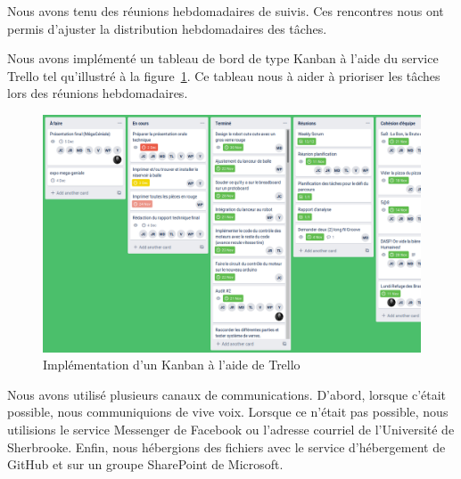 Nous avons tenu des réunions hebdomadaires de suivis.
Ces rencontres nous ont permis d'ajuster la distribution hebdomadaires des tâches.

Nous avons implémenté un tableau de bord de type Kanban à l'aide du service Trello tel qu'illustré à la figure~\ref{fig:planif-trello}.
Ce tableau nous à aider à prioriser les tâches lors des réunions hebdomadaires.

\begin{figure}[h!]
    \centering
    \includegraphics[width=\linewidth]{img/s1/trello}
    \caption{Implémentation d'un Kanban à l'aide de Trello}
    \label{fig:planif-trello}
\end{figure}

Nous avons utilisé plusieurs canaux de communications.
D'abord, lorsque c'était possible, nous communiquions de vive voix.
Lorsque ce n'était pas possible, nous utilisions le service Messenger de Facebook ou l'adresse courriel de l’Université de Sherbrooke.
Enfin, nous hébergions des fichiers avec le service d'hébergement de GitHub et sur un groupe SharePoint de Microsoft.
